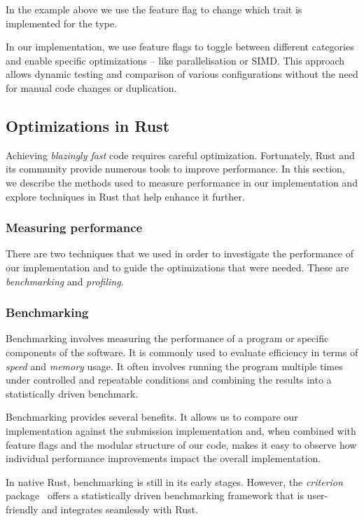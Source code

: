\documentclass[11pt]{report}
\theoremstyle{definition}
\theoremstyle{plain}
\begin{document}
In the example above we use the feature flag to change which trait is implemented for the  type.

In our implementation, we use feature flags to toggle between different categories and enable specific optimizations -- like parallelisation or SIMD. This approach allows dynamic testing and comparison of various configurations without the need for manual code changes or duplication.

\subsection{Optimizations in Rust}\label{sub:rust_optimizations}
Achieving \textit{blazingly fast} code requires careful optimization. Fortunately, Rust and its community provide numerous tools to improve performance. In this section, we describe the methods used to measure performance in our implementation and explore techniques in Rust that help enhance it further.

\subsubsection*{Measuring performance}\label{sec:rust_benchmarking}
There are two techniques that we used in order to investigate the performance of our implementation and to guide the optimizations that were needed. These are \textit{benchmarking} and \textit{profiling}.

\subsubsection{Benchmarking}
Benchmarking involves measuring the performance of a program or specific components of the software. It is commonly used to evaluate efficiency in terms of \textit{speed} and \textit{memory} usage. It often involves running the program multiple times under controlled and repeatable conditions and combining the results into a statistically driven benchmark.

Benchmarking provides several benefits. It allows us to compare our implementation against the submission implementation and, when combined with feature flags and the modular structure of our code, makes it easy to observe how individual performance improvements impact the overall implementation.

In native Rust, benchmarking is still in its early stages. However, the \textit{criterion} package~\cite{criterion} offers a statistically driven benchmarking framework that is user-friendly and integrates seamlessly with Rust.
\end{document}
